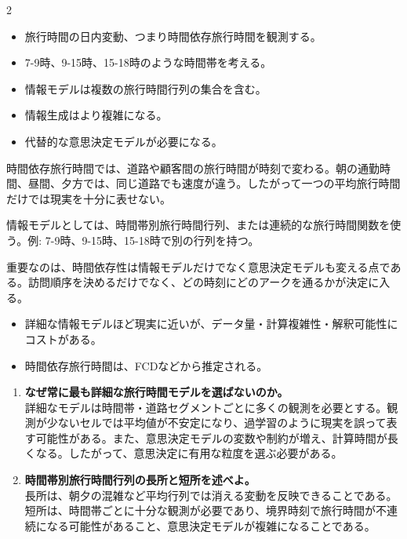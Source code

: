 \clearpage
{}
\begin{multicols}{2}\footnotesize\raggedcolumns
{}
\begin{itemize}
\item 旅行時間の日内変動、つまり時間依存旅行時間を観測する。
\item 7-9時、9-15時、15-18時のような時間帯を考える。
\item 情報モデルは複数の旅行時間行列の集合を含む。
\item 情報生成はより複雑になる。
\item 代替的な意思決定モデルが必要になる。
\end{itemize}
時間依存旅行時間では、道路や顧客間の旅行時間が時刻で変わる。朝の通勤時間、昼間、夕方では、同じ道路でも速度が違う。したがって一つの平均旅行時間だけでは現実を十分に表せない。\par

情報モデルとしては、時間帯別旅行時間行列、または連続的な旅行時間関数を使う。例: 7-9時、9-15時、15-18時で別の行列を持つ。\par

重要なのは、時間依存性は情報モデルだけでなく意思決定モデルも変える点である。訪問順序を決めるだけでなく、どの時刻にどのアークを通るかが決定に入る。\par
{}
\begin{itemize}
\item 詳細な情報モデルほど現実に近いが、データ量・計算複雑性・解釈可能性にコストがある。
\item 時間依存旅行時間は、FCDなどから推定される。
\end{itemize}
\begin{enumerate}
\item \textbf{なぜ常に最も詳細な旅行時間モデルを選ばないのか。}\\詳細なモデルは時間帯・道路セグメントごとに多くの観測を必要とする。観測が少ないセルでは平均値が不安定になり、過学習のように現実を誤って表す可能性がある。また、意思決定モデルの変数や制約が増え、計算時間が長くなる。したがって、意思決定に有用な粒度を選ぶ必要がある。
\item \textbf{時間帯別旅行時間行列の長所と短所を述べよ。}\\長所は、朝夕の混雑など平均行列では消える変動を反映できることである。短所は、時間帯ごとに十分な観測が必要であり、境界時刻で旅行時間が不連続になる可能性があること、意思決定モデルが複雑になることである。
\end{enumerate}
\end{multicols}

